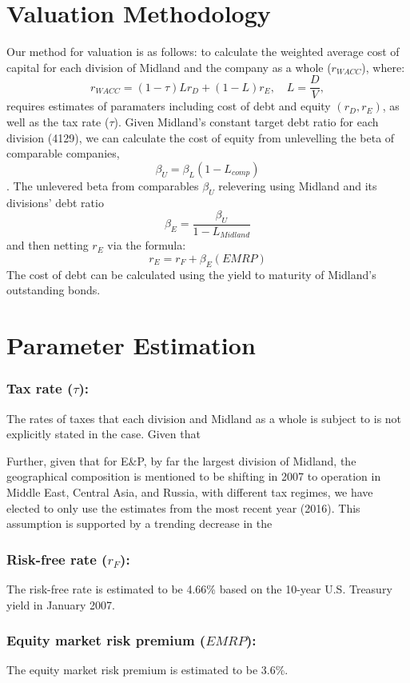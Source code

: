 \documentclass{article}
\begin{document}
\section{Valuation Methodology}
Our method for valuation is as follows: to calculate the weighted average cost of capital for each division of Midland and the company as a whole ($r_{W\!ACC}$), where:
\[r_{W\!ACC} = (1 - \tau)Lr_{D} + (1-L)r_E, \quad L=\frac{D}{V},\]
requires estimates of paramaters including cost of debt and equity $(r_{D},r_{E})$, as well as the tax rate ($\tau$). Given Midland's constant target debt ratio for each division (4129), we can calculate the cost of equity from unlevelling the beta of comparable companies, 
$$\beta_U=\beta_L(1-L_{comp})$$
. The unlevered beta from comparables $\beta_U$ relevering using Midland and its divisions' debt ratio
$$\beta_E=\frac{\beta_U}{1-L_{Midland}}$$
and then netting $r_E$ via the formula:
$$r_E=r_F+\beta_E(EMRP)$$
The cost of debt can be calculated using the yield to maturity of Midland's outstanding bonds.

\hrulefill
\section{Parameter Estimation}
\subsubsection*{Tax rate ($\tau$):}The rates of taxes that each division and Midland as a whole is subject to is not explicitly stated in the case. Given that 

Further, given that for E\&P, by far the largest division of Midland, the geographical composition is mentioned to be shifting in 2007 to operation in Middle East, Central Asia, and Russia, with different tax regimes, we have elected to only use the estimates from the most recent year (2016). This assumption is supported by a trending decrease in the

\subsubsection*{Risk-free rate ($r_F$):} The risk-free rate is estimated to be 4.66\% based on the 10-year U.S. Treasury yield in January 2007.

\subsubsection*{Equity market risk premium ($EMRP$):} The equity market risk premium is estimated to be 3.6\%.
\end{document}
